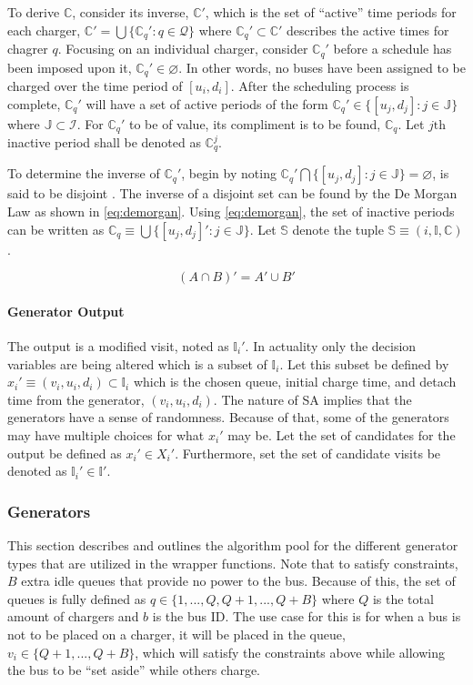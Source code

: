 \documentclass[11pt,a4paper,final]{article}
\newcommand{\I}{\mathbb{I}}                 %
\newcommand{\C}{\mathbb{C}}                 %
\newcommand{\Sol}{\mathbb{S}}               %
\newcommand{\Jsetq}{\mathbb{J}}             %
\begin{document}
To derive \(\C\), consider its inverse, \(\C'\), which is the set of ``active'' time periods for each charger, \(\C' = \bigcup
\{\C_q' : q \in \mathcal{Q}\}\) where \(\C_q' \subset \C'\) describes the active times for chagrer \(q\). Focusing on an individual charger,
consider \(\C_q'\) before a schedule has been imposed upon it, \(\C_q' \in \varnothing\). In other words, no buses have been
assigned to be charged over the time period of \([u_i, d_i]\). After the scheduling process is complete, \(\C_q'\) will have
a set of active periods of the form \(\C_q' \in \{[u_j, d_j]: j \in \Jsetq \}\) where \(\Jsetq \subset \mathcal{I}\). For \(\C_q'\) to be of
value, its compliment is to be found, \(\C_q\). Let \(j\text{th}\) inactive period shall be denoted as \(\C^j_q\).

To determine the inverse of \(\C_q'\), begin by noting \(\C_q' \bigcap \{[u_j, d_j] : j \in \Jsetq\} = \varnothing\), is said to be
disjoint \cite{halmos-1974-naive-set-theor}. The inverse of a disjoint set can be found by the De Morgan Law as shown
in \ref{eq:demorgan}. Using \ref{eq:demorgan}, the set of inactive periods can be written as \(\C_q \equiv \bigcup \{[u_j, d_j]': j \in \Jsetq\}\).
Let \(\Sol\) denote the tuple \(\Sol \equiv (i, \I, \C)\).

\begin{equation}
\label{eq:demorgan}
(A \cap B)' = A' \cup B'
\end{equation}

\paragraph{Generator Output}
\label{sec:org90889fd}
The output is a modified visit, noted as \(\I_i'\). In actuality only the decision variables are being altered which is a
subset of \(\I_i\). Let this subset be defined by \(x_i' \equiv (v_i, u_i, d_i) \subset \I_i\) which is the chosen queue, initial
charge time, and detach time from the generator, \((v_i, u_i, d_i)\). The nature of SA implies that the generators have a
sense of randomness. Because of that, some of the generators may have multiple choices for what \(x_i'\) may be. Let the
set of candidates for the output be defined as \(x_i' \in X_i'\). Furthermore, set the set of candidate visits be denoted as
\(\I_i' \in \I'\).

\subsubsection{Generators}
\label{sec:generators}
This section describes and outlines the algorithm pool for the different generator types that are utilized in the
wrapper functions. Note that to satisfy constraints, \(B\) extra idle queues that provide no power to the bus. Because of
this, the set of queues is fully defined as \(q \in \{1,..., Q, Q+1,..., Q+B\}\) where \(Q\) is the total amount of chargers
and \(b\) is the bus ID. The use case for this is for when a bus is not to be placed on a charger, it will be placed in
the queue, \(v_i \in \{Q+1,..., Q+B\}\), which will satisfy the constraints above while allowing the bus to be ``set aside''
while others charge.
\end{document}
